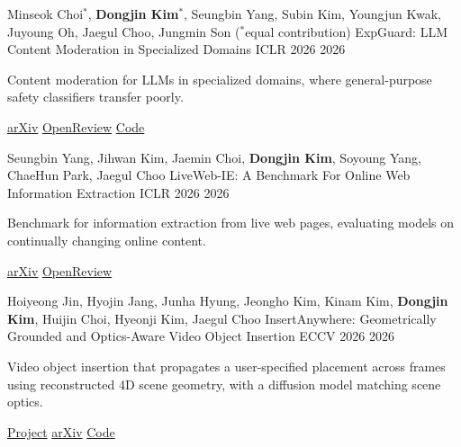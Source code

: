 \begin{cventries}
  \cventry
    {Minseok Choi$^*$, \textbf{Dongjin Kim}$^*$, Seungbin Yang, Subin Kim, Youngjun Kwak, Juyoung Oh, Jaegul Choo, Jungmin Son \quad ($^*$equal contribution)}
    {ExpGuard: LLM Content Moderation in Specialized Domains}
    {ICLR 2026}
    {2026}
    {%
      \begin{cvitems}
        \item Content moderation for LLMs in specialized domains, where general-purpose safety classifiers transfer poorly.
        \item \href{https://arxiv.org/abs/2603.02588}{arXiv} \quad
              \href{https://openreview.net/forum?id=t5cYJlV6aJ}{OpenReview} \quad
              \href{https://github.com/brightjade/ExpGuard}{Code}
      \end{cvitems}
    }

  \cventry
    {Seungbin Yang, Jihwan Kim, Jaemin Choi, \textbf{Dongjin Kim}, Soyoung Yang, ChaeHun Park, Jaegul Choo}
    {LiveWeb-IE: A Benchmark For Online Web Information Extraction}
    {ICLR 2026}
    {2026}
    {%
      \begin{cvitems}
        \item Benchmark for information extraction from live web pages, evaluating models on continually changing online content.
        \item \href{https://arxiv.org/abs/2603.13773}{arXiv} \quad
              \href{https://openreview.net/forum?id=bIODmQ1TNd}{OpenReview}
      \end{cvitems}
    }

  \cventry
    {Hoiyeong Jin, Hyojin Jang, Junha Hyung, Jeongho Kim, Kinam Kim, \textbf{Dongjin Kim}, Huijin Choi, Hyeonji Kim, Jaegul Choo}
    {InsertAnywhere: Geometrically Grounded and Optics-Aware Video Object Insertion}
    {ECCV 2026}
    {2026}
    {%
      \begin{cvitems}
        \item Video object insertion that propagates a user-specified placement across frames using reconstructed 4D scene geometry, with a diffusion model matching scene optics.
        \item \href{https://myyzzzoooo.github.io/InsertAnywhere/}{Project} \quad
              \href{https://arxiv.org/abs/2512.17504}{arXiv} \quad
              \href{https://github.com/myyzzzoooo/InsertAnywhere}{Code}
      \end{cvitems}
    }

\end{cventries}

